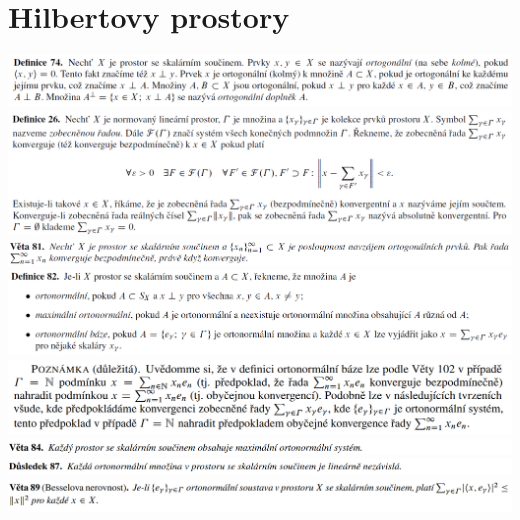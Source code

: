\documentclass[12pt,a4paper]{article}
\begin{document}
\section{Hilbertovy prostory}
	\begin{center}
		\includegraphics[width=\textwidth]{img/3hilp/2020-06-21 13 01 41.png}\vspace{0.3cm}
		\includegraphics[width=\textwidth]{img/3hilp/2020-06-21 17 33 02.png}\vspace{0.3cm}
		\includegraphics[width=\textwidth]{img/3hilp/2020-06-21 13 02 43.png}\vspace{0.3cm}
		\includegraphics[width=\textwidth]{img/3hilp/2020-06-21 13 02 55.png}\vspace{0.3cm}
		\includegraphics[width=\textwidth]{img/3hilp/2020-06-21 13 04 44.png}\vspace{0.3cm}
		\includegraphics[width=\textwidth]{img/3hilp/Image 009.png}\vspace{0.3cm}
		\includegraphics[width=\textwidth]{img/3hilp/Image 010.png}\vspace{0.3cm}
		\includegraphics[width=\textwidth]{img/3hilp/Image 011.png}\vspace{0.3cm}

\end{center}
\end{document}
